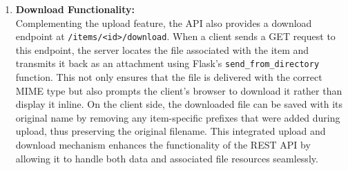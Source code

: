 \begin{enumerate}
\item \textbf{Download Functionality:}\\  
Complementing the upload feature, the API also provides a download endpoint at \linebreak\texttt{/items/\textless id\textgreater/download}. When a client sends a GET request to this endpoint, the server locates the file associated with the item and transmits it back as an attachment using Flask's \texttt{send\_from\_directory} function. This not only ensures that the file is delivered with the correct MIME type but also prompts the client’s browser to download it rather than display it inline. On the client side, the downloaded file can be saved with its original name by removing any item-specific prefixes that were added during upload, thus preserving the original filename. This integrated upload and download mechanism enhances the functionality of the REST API by allowing it to handle both data and associated file resources seamlessly.

\end{enumerate}

